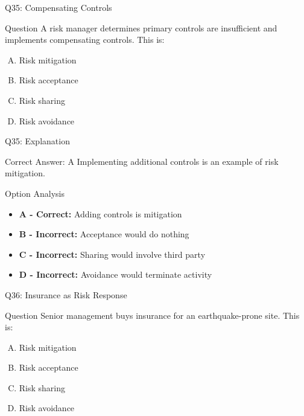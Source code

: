 \documentclass{beamer}
\begin{document}
	\begin{frame}{Q35: Compensating Controls}
		\begin{block}{Question}
			A risk manager determines primary controls are insufficient and implements compensating controls. This is:
		\end{block}
		\begin{enumerate}[(A)]
			\item Risk mitigation
			\item Risk acceptance
			\item Risk sharing
			\item Risk avoidance
		\end{enumerate}
	\end{frame}
	
	\begin{frame}{Q35: Explanation}
		\begin{block}{Correct Answer: A}
			Implementing additional controls is an example of risk mitigation.
		\end{block}
		\begin{block}{Option Analysis}
			\begin{itemize}
				\item \textbf{A - Correct:} Adding controls is mitigation
				\item \textbf{B - Incorrect:} Acceptance would do nothing
				\item \textbf{C - Incorrect:} Sharing would involve third party
				\item \textbf{D - Incorrect:} Avoidance would terminate activity
			\end{itemize}
		\end{block}
	\end{frame}
	
	\begin{frame}{Q36: Insurance as Risk Response}
		\begin{block}{Question}
			Senior management buys insurance for an earthquake-prone site. This is:
		\end{block}
		\begin{enumerate}[(A)]
			\item Risk mitigation
			\item Risk acceptance
			\item Risk sharing
			\item Risk avoidance
		\end{enumerate}
	\end{frame}
	
\end{document}
